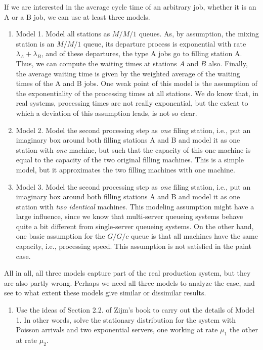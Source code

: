 \begin{question}[use=false]
If we are interested in the average cycle time of an arbitrary job,
whether it is an A or a B job, we can use at least three models.  
\begin{enumerate}
\item Model 1. Model all stations as $M/M/1$ queues. As, by
  assumption, the mixing station is an $M/M/1$ queue, its departure
  process is exponential with rate $\lambda_A + \lambda_B$, and of
  these departures, the type A jobs go to filling station A. Thus, we
  can compute the waiting times at stations $A$ and $B$ also. Finally,
  the average waiting time is given by the weighted average of the
  waiting times of the A and B jobs. One weak point of this model is
  the assumption of the exponentiality of the processing times at all
  stations. We do know that, in real systems, processing times are not
  really exponential, but the extent to which a deviation of this
  assumption leads, is not so clear.
\item Model 2. Model the second processing step as \emph{one} filing
  station, i.e., put an imaginary box around both filling stations A
  and B and model it as one station with \emph{one} machine, but
  such that the capacity of this one machine is equal to the capacity
  of the two original filling machines. This is a simple model, but it
  approximates the two filling machines with one machine. 
\item Model 3. Model the second processing step as \emph{one} filing
  station, i.e., put an imaginary box around both filling stations A
  and B and model it as one station with \emph{two identical}
  machines. This modeling assumption might have a large influence,
  since we know that multi-server queueing systems behave quite a bit
  different from single-server queueing systems. On the other hand,
  one basic assumption for the $G/G/c$ queue is that all machines have
  the same capacity, i.e., processing speed. This assumption is not
  satisfied in the paint case.
\end{enumerate}
All in all, all three models capture part of the real production
system, but they are also partly wrong.  Perhaps we need all three
models to analyze the case, and see to what extent these models give
similar or dissimilar results.


\begin{enumerate}[resume]
\item   Use the ideas of Section 2.2. of Zijm's book to carry out the
  details of Model 1.  In other words, solve the stationary
  distribution for the system with Poisson arrivals and two
  exponential servers, one working at rate $\mu_1$ the other at rate
  $\mu_2$.
\end{enumerate}


\end{question}
